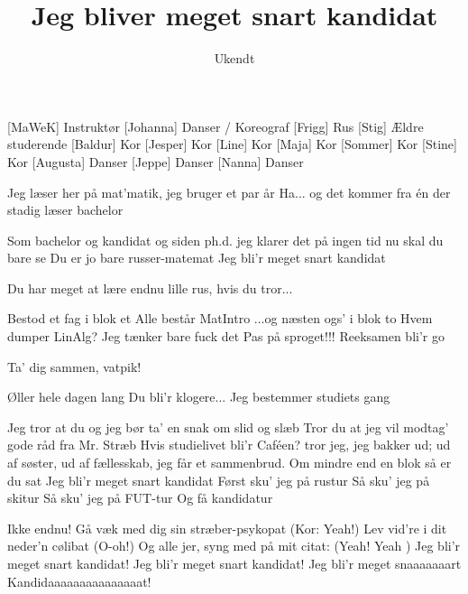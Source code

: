 \documentclass[a4paper,11pt]{article}
\title{Jeg bliver meget snart kandidat}
\author{Ukendt}
\begin{document}
\maketitle

\begin{roles}
[MaWeK] Instruktør
[Johanna] Danser / Koreograf
[Frigg] Rus
[Stig] Ældre studerende
[Baldur] Kor
[Jesper] Kor
[Line] Kor
[Maja] Kor
[Sommer] Kor
[Stine] Kor
[Augusta] Danser
[Jeppe] Danser
[Nanna] Danser
\end{roles}

\begin{song}
 Jeg læser her på mat'matik, jeg bruger et par år
 Ha... og det kommer fra én der stadig læser bachelor

 Som bachelor og kandidat og siden ph.d.
jeg klarer det på ingen tid nu skal du bare se
 Du er jo bare russer-matemat
 Jeg bli'r meget snart kandidat

 Du har meget at lære endnu lille rus, hvis du tror...

 Bestod et fag i blok et
 Alle består MatIntro
 ...og næsten ogs' i blok to
 Hvem dumper LinAlg?
 Jeg tænker bare fuck det
 Pas på sproget!!!
 Reeksamen bli'r go

 Ta' dig sammen, vatpik!

 Øller hele dagen lang
 Du bli'r klogere...
 Jeg bestemmer studiets gang

 Jeg tror at du og jeg bør ta' en snak om slid og slæb
 Tror du at jeg vil modtag' gode råd fra Mr. Stræb
 Hvis studielivet bli'r Caféen? tror jeg, jeg bakker ud;
ud af søster, ud af fællesskab, jeg får et sammenbrud.
Om mindre end en blok så er du sat
 Jeg bli'r meget snart kandidat
Først sku' jeg på rustur
Så sku' jeg på skitur
Så sku' jeg på FUT-tur
Og få kandidatur

 Ikke endnu!
 Gå væk med dig sin stræber-psykopat (Kor: Yeah!)
 Lev vid're i dit neder'n cølibat (O-oh!)
 Og alle jer, syng med på mit citat: (Yeah! Yeah )
 Jeg bli'r meget snart kandidat!
Jeg bli'r meget snart kandidat!
Jeg bli'r meget snaaaaaaart
Kandidaaaaaaaaaaaaaaat!
\end{song}
\end{document}
